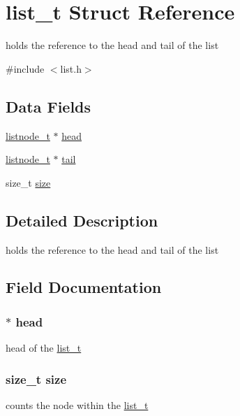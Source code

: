 \hypertarget{structlist__t}{}\section{list\+\_\+t Struct Reference}
\label{structlist__t}


holds the reference to the head and tail of the list  




{\ttfamily \#include $<$list.\+h$>$}

\subsection*{Data Fields}
\begin{DoxyCompactItemize}
\item 
\hyperlink{structlistnode__t}{listnode\+\_\+t} $\ast$ \hyperlink{structlist__t_a442bdcffeda945e7439d6308a8a38bb9}{head}
\item 
\hyperlink{structlistnode__t}{listnode\+\_\+t} $\ast$ \hyperlink{structlist__t_aadd75bfd4f098ab0aa1e6aa547f35841}{tail}
\item 
size\+\_\+t \hyperlink{structlist__t_a854352f53b148adc24983a58a1866d66}{size}
\end{DoxyCompactItemize}


\subsection{Detailed Description}
holds the reference to the head and tail of the list 

\subsection{Field Documentation}
\subsubsection[{\texorpdfstring{head}{head}}]{$\ast$ head}\hypertarget{structlist__t_a442bdcffeda945e7439d6308a8a38bb9}{}\label{structlist__t_a442bdcffeda945e7439d6308a8a38bb9}
head of the \hyperlink{structlist__t}{list\+\_\+t} 
\subsubsection[{\texorpdfstring{size}{size}}]{\setlength{\rightskip}{0pt plus 5cm}size\+\_\+t size}\hypertarget{structlist__t_a854352f53b148adc24983a58a1866d66}{}\label{structlist__t_a854352f53b148adc24983a58a1866d66}
counts the node within the \hyperlink{structlist__t}{list\+\_\+t} 
